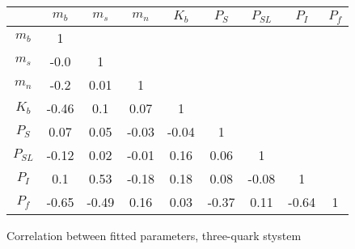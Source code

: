 \begin{tabular}{c  c  c  c  c  c  c  c  c}\hline \hline
         &  $m_{b}$       &     $m_{s}$    &    $m_{n}$  &      $K_b$    & $P_S$ & $P_{SL}$ & $P_I$ & $P_f$ \\ \hline
 $m_{b}$ &     1   &   &   &   &    &   &   &  \\ 
 $m_{s}$ & -0.0 &  1   &   &   &   &   &   &  \\ 
 $m_{n}$ & -0.2 & 0.01 &  1   &   &   &   &   & \\ 
 $K_b$   & -0.46 & 0.1 & 0.07 &  1   &   &   &   &   \\ 
 $P_S$   & 0.07 & 0.05 & -0.03 & -0.04 & 1 &   &   & \\ 
 $P_{SL}$& -0.12 & 0.02 & -0.01 & 0.16 & 0.06 & 1  &   & \\ 
 $P_I$   & 0.1 & 0.53 & -0.18 & 0.18 & 0.08 & -0.08 & 1  &  \\ 
 $P_f$   & -0.65 & -0.49 & 0.16 & 0.03 & -0.37 & 0.11 & -0.64 & 1 \\ \hline \hline
\end{tabular}
\caption{Correlation between fitted parameters, three-quark stystem }
\label{tab:3quark_corr}
